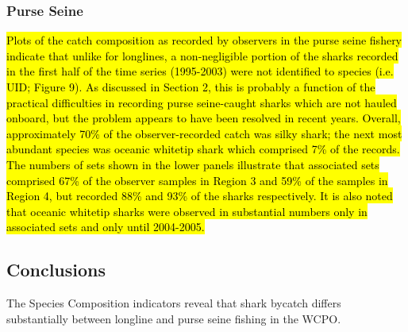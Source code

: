 \documentclass[12pt]{SCreport}
\begin{document}
  
 \subsubsection*{Purse Seine} 
 
\hl{ Plots of the catch composition as recorded by observers in the purse seine fishery indicate that unlike for longlines, a non-negligible portion of the sharks recorded in the first half of the time series (1995-2003) were not identified to species (i.e. UID; Figure 9). As discussed in Section 2, this is probably a function of the practical difficulties in recording purse seine-caught sharks which are not hauled onboard, but the problem appears to have been resolved in recent years. Overall, approximately 70\% of the observer-recorded catch was silky shark; the next most abundant species was oceanic whitetip shark which comprised 7\% of the records. The numbers of sets shown in the lower panels illustrate that associated sets comprised 67\% of the observer samples in Region 3 and 59\% of the samples in Region 4, but recorded 88\% and 93\% of the sharks respectively. It is also noted that oceanic whitetip sharks were observed in substantial numbers only in associated sets and only until 2004-2005.}
 


 
 
 \subsection{Conclusions}

The Species Composition indicators reveal that shark bycatch differs substantially between longline and purse seine fishing in the WCPO.  
\end{document}

